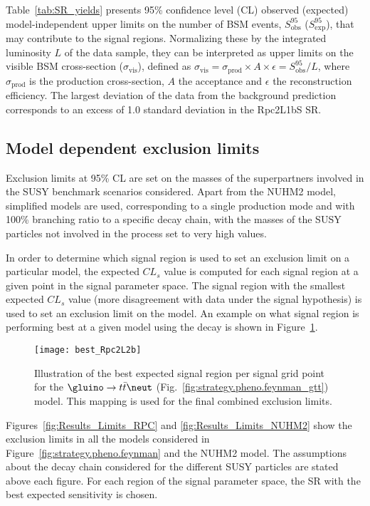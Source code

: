 Table~\ref{tab:SR_yields} presents 95\% confidence level (CL) observed (expected) model-independent upper limits 
on the number of BSM events, $S_{\textrm{obs}}^{95}$ ($S_{\textrm{exp}}^{95}$), that may contribute to the signal regions. 
Normalizing these by the integrated luminosity $L$ of the data sample, they can be interpreted as upper limits on the visible 
BSM cross-section ($\sigma_{\textrm{vis}}$), defined as $\sigma_{\textrm{vis}}=\sigma_{\textrm{prod}}\times A \times\epsilon=S_{\textrm{obs}}^{95}/L$, where 
$\sigma_{\textrm{prod}}$ is the production cross-section, $A$ the acceptance and $\epsilon$ the reconstruction efficiency. The largest 
deviation of the data from the background prediction corresponds to an excess of 1.0 standard deviation in the Rpc2L1bS SR.


\subsection{Model dependent exclusion limits}

Exclusion limits at 95\% CL are set on the masses of the superpartners involved in the SUSY benchmark scenarios considered. 
Apart from the NUHM2 model, simplified models are used, corresponding to a single production mode and with 100\% branching ratio to a specific decay chain, 
with the masses of the SUSY particles not involved in the process set to very high values. 

In order to determine which signal region is used to set an exclusion limit 
on a particular model, the expected $CL_s$ value is computed for each signal 
region at a given point in the signal parameter space. The signal 
region with the smallest expected  $CL_s$ value (more disagreement with data 
under the signal hypothesis) is used to set an exclusion limit on the model.
An example on what signal region is performing best at a given model using the 
decay is shown in Figure~\ref{fig:res.best_gtt}.

\begin{figure}[htb!]
\centering
\texttt{[image: best\_Rpc2L2b]}
\caption{Illustration of the best expected signal region per signal grid point for the 
$\gluino \to t\bar t\neut$ (Fig.~\ref{fig:strategy.pheno.feynman_gtt}) model. 
This mapping is used for the final combined exclusion limits.}
\label{fig:res.best_gtt}
\end{figure}


Figures~\ref{fig:Results_Limits_RPC} and \ref{fig:Results_Limits_NUHM2} show the exclusion limits in all 
the models considered in Figure~\ref{fig:strategy.pheno.feynman} and the NUHM2 model. The assumptions about the decay chain considered for the different SUSY particles are 
stated above each figure. For each region of the signal parameter space, the SR with the best expected sensitivity is chosen.

